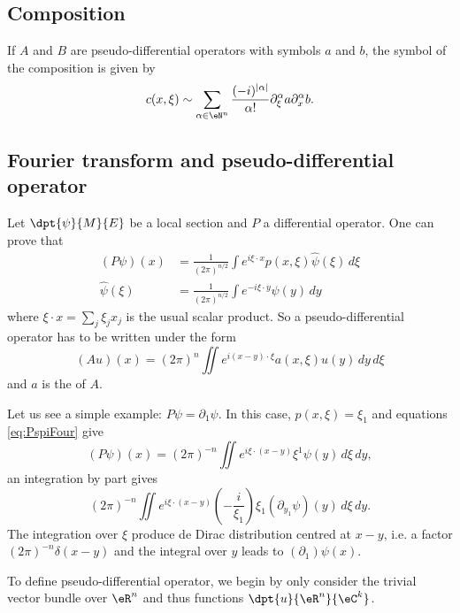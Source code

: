 \subsection{Composition}

If $A$ and $B$ are pseudo-differential operators with symbols $a$ and $b$, the symbol of the composition is given by
\begin{equation}		\label{EqCompPSDSymb}
	c(x,\xi)\sim \sum_{\alpha\in\eN^n} \frac{ (-i)^{| \alpha |} }{ \alpha! }\partial_{\xi}^{\alpha}a\partial_x^{\alpha}b.
\end{equation}


\subsection{Fourier transform and pseudo-differential operator}

Let $\dpt{ \psi }{ M }{ E }$ be a local section and $P$ a differential operator. One can prove that
\begin{subequations} \label{eq:PspiFour}
	\begin{align}
		(P\psi)(x)    & =\frac{1}{ (2\pi)^{n/2} } \int e^{i\xi\cdot x}p(x,\xi)\hat\psi(\xi)\,d\xi \\
		\hat\psi(\xi) & = \frac{1}{ (2\pi)^{n/2} }\int e^{-i\xi\cdot y}\psi(y)\,dy
	\end{align}
\end{subequations}
where $\xi\cdot x=\sum_j\xi_jx_j$ is the usual scalar product. So a pseudo-differential operator has to be written under the form
\begin{equation}
	(Au)(x)=(2\pi)^n\iint e^{i(x-y)\cdot \xi}a(x,\xi)u(y)\,dy\,d\xi
\end{equation}
and $a$ is the  of $A$.


Let us see a simple example: $P\psi=\partial_1\psi$. In this case, $p(x,\xi)=\xi_1$ and equations \eqref{eq:PspiFour} give
\[
	(P\psi)(x)=(2\pi)^{-n}\iint e^{i\xi\cdot(x-y)}\xi^1\psi(y)\,d\xi\,dy,
\]
an integration by part gives
\[
	(2\pi)^{-n}\iint e^{i\xi\cdot(x-y)}(-\frac{ i }{ \xi_1 })\xi_1(\partial_{y_1}\psi)(y)\,d\xi\,dy.
\]
The integration over $\xi$ produce de Dirac distribution centred at $x-y$, i.e. a factor $(2\pi)^{-n}\delta(x-y)$ and the integral over $y$ leads to $(\partial_1)\psi(x)$.

To define pseudo-differential operator, we begin by only consider the trivial vector bundle over $\eR^n$ and thus functions $\dpt{ u }{ \eR^n }{ \eC^k }$.

